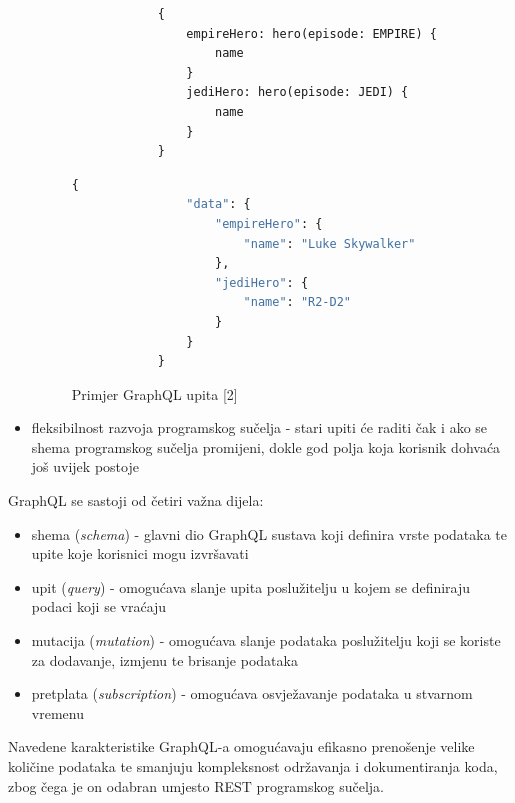 \documentclass[zavrsnirad]{fer}
\begin{document}
\begin{itemize}
 	\begin{figure}[htb]
 		\centering
 		 	\begin{lstlisting}
 			{
 				empireHero: hero(episode: EMPIRE) {
 					name
 				}
 				jediHero: hero(episode: JEDI) {
 					name
 				}
 			}
 		\end{lstlisting}
 		\begin{lstlisting}[language=GraphQL]
 			{
 				"data": {
 					"empireHero": {
 						"name": "Luke Skywalker"
 					},
 					"jediHero": {
 						"name": "R2-D2"
 					}
 				}
 			}
 		\end{lstlisting}
 		\caption{Primjer GraphQL upita [2]}
 	\end{figure}
 	\FloatBarrier
 	
  	\item {fleksibilnost razvoja programskog sučelja} - stari upiti će raditi čak i ako se shema programskog sučelja promijeni, dokle god polja koja korisnik dohvaća još uvijek postoje
 \end{itemize}
GraphQL se sastoji od četiri važna dijela:
\begin{itemize}
	\item shema (\textit{schema}) - glavni dio GraphQL sustava koji definira vrste podataka te upite koje korisnici mogu izvršavati
	\item upit (\textit{query}) - omogućava slanje upita poslužitelju u kojem se definiraju podaci koji se vraćaju
	\item mutacija (\textit{mutation}) - omogućava slanje podataka poslužitelju koji se koriste za dodavanje, izmjenu te brisanje podataka
	\item pretplata (\textit{subscription}) - omogućava osvježavanje podataka u stvarnom vremenu
\end{itemize}
Navedene karakteristike GraphQL-a omogućavaju efikasno prenošenje velike količine podataka te smanjuju kompleksnost održavanja i dokumentiranja koda, zbog čega je on odabran umjesto REST programskog sučelja.
\end{document}
